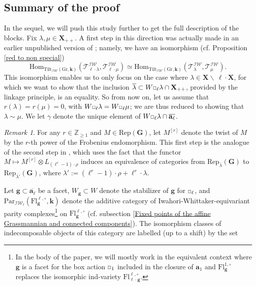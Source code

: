 \documentclass[11pt]{amsart}
\theoremstyle{plain}
\theoremstyle{remark}
\newtheorem{rem}[thm]{Remark}
\newcommand{\car}{\mbox{\relsize{-5}$\Box$}}
\numberwithin{equation}{section}
\begin{document}
	\subsection{Summary of the proof} In the sequel, we will push this study further to get the full description of the blocks. Fix $\lambda,\mu\in\mathbf{X}_{++}$. A first step in this direction was actually made in an earlier unpublished version of \cite{riche2020smithtreumann}; namely, we have an isomorphism (cf. Proposition \ref{red to non special})
		$$\mathrm{Hom}_{\mathrm{Tilt}_\mathcal{IW}(\mathrm{Gr},\mathbf{k})}(\mathscr{T}^\mathcal{IW}_{\ell\cdot\lambda},\mathscr{T}^\mathcal{IW}_{\ell\cdot\mu})\simeq \mathrm{Hom}_{\mathrm{Tilt}_\mathcal{IW}(\mathrm{Gr},\mathbf{k})}(\mathscr{T}^\mathcal{IW}_{\lambda},\mathscr{T}^\mathcal{IW}_{\mu}).$$
	This isomorphism enables us to only focus on the case where $\lambda\in\mathbf{X}\backslash~\ell\cdot\mathbf{X}$, for which we want to show that the inclusion $\overline{\lambda}\subset W\car_\ell\lambda\cap\mathbf{X}_{++}$, provided by the linkage principle, is an equality. So from now on, let us assume that $r(\lambda)=r(\mu)=0$, with $W\car_\ell\lambda=W\car_\ell\mu$; we are thus reduced to showing that $\lambda\sim\mu$. We let $\gamma$ denote the unique element of $W\car_\ell\lambda\cap \overline{\mathbf{a}_\ell}$.
	\begin{rem}\label{rem regular singular}
	    For any $r\in\mathbb{Z}_{\geq 1}$ and $M\in\mathrm{Rep}(\mathbf{G})$, let $M^{[r]}$ denote the twist of $M$ by the $r$-th power of the Frobenius endomorphism. This first step is the analogue of the second step in \cite{article}, which uses the fact that the functor $M\mapsto M^{[r]}\otimes L_{(\ell^r-1)\cdot\rho}$ induces an equivalence of categories from $\mathrm{Rep}_{\overline{\lambda}}(\mathbf{G})$ to $\mathrm{Rep}_{\overline{\lambda'}}(\mathbf{G})$, where $\lambda':=(\ell^r-1)\cdot\rho+\ell^r\cdot\lambda$.
	\end{rem}
	Let $\mathbf{g}\subset\overline{\mathbf{a}_\ell}$ be a facet, $W_\mathbf{g}\subset W$ denote the stabilizer of $\mathbf{g}$ for $\car_\ell$, and $\mathrm{Par}_{\mathcal{IW}_\ell}(\mathrm{Fl}^{\ell,\circ}_{\mathbf{g}},\mathbf{k})$ denote the additive category of Iwahori-Whittaker-equivariant parity complexes\footnote{In the body of the paper, we will mostly work in the equivalent context where $\mathbf{g}$ is a facet for the box action $\car_1$ included in the closure of $\mathbf{a}_1$ and $\mathrm{Fl}^{1,\circ}_{\mathbf{g}}$ replaces the isomorphic ind-variety $\mathrm{Fl}^{\ell,\circ}_{\ell\cdot\mathbf{g}}$.} on $\mathrm{Fl}^{\ell,\circ}_{\mathbf{g}}$ (cf. subsection \ref{Fixed points of the affine Grassmannian and connected components}). The isomorphism classes of indecomposable objects of this category are labelled (up to a shift) by the set 
\end{document}
